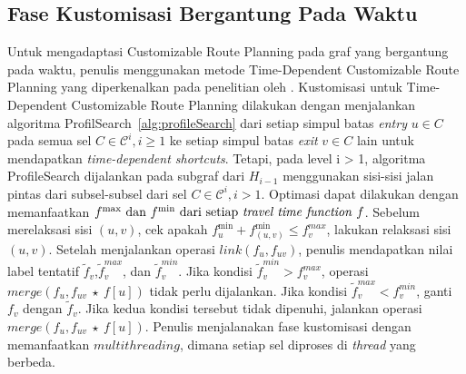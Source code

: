 \subsection{Fase Kustomisasi Bergantung Pada Waktu}
\label{subsec:tdcrp-timedependent-customization}
Untuk mengadaptasi Customizable Route Planning pada graf yang bergantung pada waktu, penulis menggunakan metode Time-Dependent Customizable Route Planning yang diperkenalkan pada penelitian oleh \cite{Baum2016}. Kustomisasi untuk Time-Dependent Customizable Route Planning dilakukan dengan menjalankan algoritma ProfilSearch~\ref{alg:profileSearch} dari setiap simpul batas \textit{entry} $u\in C$ pada semua sel $C\in\mathcal{C}^{i}, i\geq 1$ ke setiap simpul batas \textit{exit} $v\in C$ lain untuk mendapatkan \textit{time-dependent shortcuts}.  Tetapi, pada level i > 1, algoritma ProfileSearch dijalankan pada subgraf dari $H_{i-1}$ menggunakan sisi-sisi jalan pintas dari subsel-subsel dari sel $C\in\mathcal{C}^i, i>1$. Optimasi dapat dilakukan dengan memanfaatkan $f^{\max}\text{ dan }f^{\min} \text{ dari setiap \textit{travel time function} } f $. Sebelum merelaksasi sisi $(u,v)$, cek apakah $f_{u}^{\min}+f_{(u,v)}^{\min}\leq f^{max}_v$, lakukan relaksasi sisi $(u,v)$. Setelah menjalankan operasi $link(f_u,f_{uv})$, penulis mendapatkan nilai label tentatif $\tilde{f}_v$,$\tilde{f}_v^{max}$, dan $\tilde{f}_v^{min}$. Jika kondisi $\tilde{f}_v^{min}>f_v^{max}$, operasi $merge(f_u,f_{uv}\ \star \ f[u])$ tidak perlu dijalankan. Jika kondisi $\tilde{f}_v^{max}<f_v^{min}$, ganti $f_v$ dengan $\tilde{f}_v$. Jika kedua kondisi tersebut tidak dipenuhi, jalankan operasi $merge(f_u,f_{uv}\ \star  \ f[u])$. Penulis menjalanakan fase kustomisasi dengan memanfaatkan $multithreading$, dimana setiap sel diproses di \textit{thread} yang berbeda.


